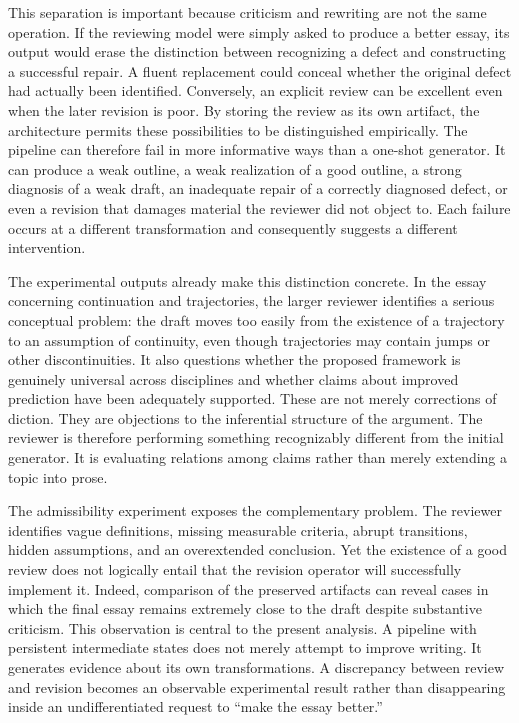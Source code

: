 \documentclass[11pt]{article}
\begin{document}
This separation is important because criticism and rewriting are not the same operation. If the reviewing model were simply asked to produce a better essay, its output would erase the distinction between recognizing a defect and constructing a successful repair. A fluent replacement could conceal whether the original defect had actually been identified. Conversely, an explicit review can be excellent even when the later revision is poor. By storing the review as its own artifact, the architecture permits these possibilities to be distinguished empirically. The pipeline can therefore fail in more informative ways than a one-shot generator. It can produce a weak outline, a weak realization of a good outline, a strong diagnosis of a weak draft, an inadequate repair of a correctly diagnosed defect, or even a revision that damages material the reviewer did not object to. Each failure occurs at a different transformation and consequently suggests a different intervention.

The experimental outputs already make this distinction concrete. In the essay concerning continuation and trajectories, the larger reviewer identifies a serious conceptual problem: the draft moves too easily from the existence of a trajectory to an assumption of continuity, even though trajectories may contain jumps or other discontinuities. It also questions whether the proposed framework is genuinely universal across disciplines and whether claims about improved prediction have been adequately supported. These are not merely corrections of diction. They are objections to the inferential structure of the argument. The reviewer is therefore performing something recognizably different from the initial generator. It is evaluating relations among claims rather than merely extending a topic into prose.

The admissibility experiment exposes the complementary problem. The reviewer identifies vague definitions, missing measurable criteria, abrupt transitions, hidden assumptions, and an overextended conclusion. Yet the existence of a good review does not logically entail that the revision operator will successfully implement it. Indeed, comparison of the preserved artifacts can reveal cases in which the final essay remains extremely close to the draft despite substantive criticism. This observation is central to the present analysis. A pipeline with persistent intermediate states does not merely attempt to improve writing. It generates evidence about its own transformations. A discrepancy between review and revision becomes an observable experimental result rather than disappearing inside an undifferentiated request to ``make the essay better.''
\end{document}
